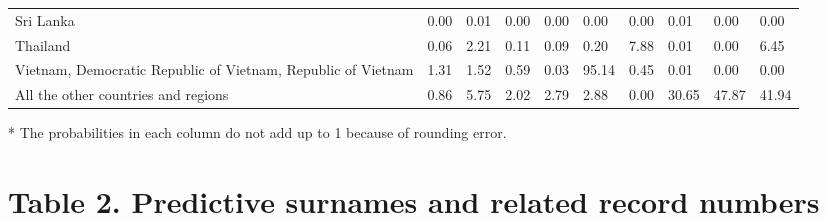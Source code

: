 \documentclass[
  landscape]{article}
\begin{document}
\begin{table}[!h]
\begin{threeparttable}
\begin{tabular}[t]{>{\raggedright\arraybackslash}p{5cm}lllllllll}
Sri Lanka & 0.00 & 0.01 & 0.00 & 0.00 & 0.00 & 0.00 & 0.01 & 0.00 & 0.00\\
Thailand & 0.06 & 2.21 & 0.11 & 0.09 & 0.20 & 7.88 & 0.01 & 0.00 & 6.45\\
Vietnam, Democratic Republic of Vietnam, Republic of Vietnam & 1.31 & 1.52 & 0.59 & 0.03 & 95.14 & 0.45 & 0.01 & 0.00 & 0.00\\
All the other countries and regions & 0.86 & 5.75 & 2.02 & 2.79 & 2.88 & 0.00 & 30.65 & 47.87 & 41.94\\
\bottomrule
\end{tabular}
\begin{tablenotes}
\small
\item [*] The probabilities in each column do not add up to 1 because of rounding error.
\end{tablenotes}
\end{threeparttable}
\end{table}

\newpage

\hypertarget{table-2.-predictive-surnames-and-related-record-numbers}{%
\section{Table 2. Predictive surnames and related record
numbers}\label{table-2.-predictive-surnames-and-related-record-numbers}}
\end{document}
